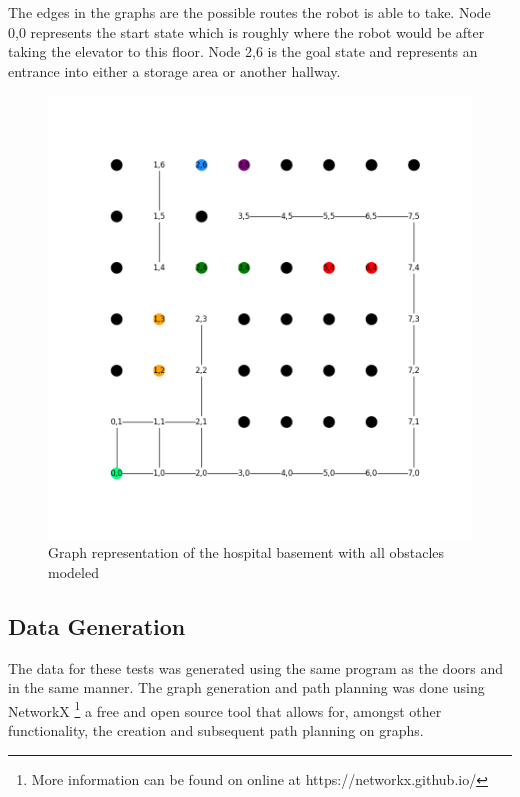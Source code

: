   The edges in the graphs are the possible routes the robot is able to take.
  Node 0,0 represents the start state which is roughly where the robot would
  be after taking the elevator to this floor. Node 2,6 is the goal state and represents
  an entrance into either a storage area or another hallway.

  \begin{figure}[!htb]
    \centering
    \includegraphics[width=\linewidth]{images/results/Full_Hospital.png}
    \caption{Graph representation of the hospital basement with all obstacles modeled}
    \label{figure:basement_congestion_full}
  \end{figure}



  \subsection{ Data Generation }

  The data for these tests was generated using the same program as the doors
  and in the same manner. The graph generation and path planning was done
  using NetworkX
  \footnote[1]{More information can be found on online at https://networkx.github.io/}
  a free and open source tool that allows for, amongst other functionality,
  the creation and subsequent path planning on graphs.

